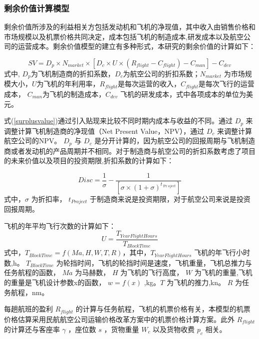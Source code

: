 \documentclass[12pt,a4paper]{report}
\begin{document}
\subsubsection{剩余价值计算模型}
剩余价值所涉及的利益相关方包括发动机和飞机的净现值，其中收入由销售价格和市场规模以及机票价格共同决定，成本包括飞机的制造成本,研发成本以及航空公司的运营成本。剩余价值模型的建立有多种形式，本研究的剩余价值的计算如下：

\begin{equation}
\label{surplusvalue}
SV={{D}_{p}}\times {{N}_{market}}\times \left[ {{D}_{c}}\times U\times \left( {{R}_{flight}}-{{C}_{flight}} \right)-{{C}_{man}} \right]-{{C}_{dev}}
\end{equation}
式中, $D_{p} $为飞机制造商的折扣系数，$ D_{c}$为航空公司的折扣系数；$ N_{market}$ 为市场规模大小，$U$为飞机的年利用率，$ R_{flight} $是每次运营的收入，$ C_{flight} $是每次飞行的运营成本， $ C_{man} $为飞机的制造成本，$ C_{dev} $ 飞机的研发成本，式中各项成本的单位为美元。

式(\ref{surplusvalue})通过引入贴现来比较不同时期内成本与收益的不同。通过 $ D_{p} $ 来调整计算飞机制造商的净现值（Net Present Value，NPV），通过 $ D_{c} $ 来调整计算航空公司的NPV。 $ D_{p} $ 与 $ D_{c} $ 是分开计算的，因为航空公司的回报周期与飞机制造商或者发动机的产品周期并不相同。对于制造商与航空公司的折扣系数考虑了项目的未来价值以及项目的投资期限,折扣系数的计算如下：

\begin{equation}
\label{discvalue}
Disc=\frac{1}{\sigma }-\frac{1}{\left[ \sigma \times {{\left( 1+\sigma  \right)}^{{{t}_{\Pr oject}}}} \right]}
\end{equation}
式中，$  \sigma  $ 为折扣率， $ t_{Project} $  于制造商来说是投资期限，对于航空公司来说是投资回报周期。

飞机的年平均飞行次数的计算如下：
\begin{equation}
\label{utilization}
U=\frac{{{T}_{YearFlightHours}}}{{{T}_{BlockTime}}}
\end{equation}
式中，${{T}_{BlockTime}}=f\left( Ma,H,W,T,R \right)$，其中，$ T_{YearFlightHours} $ 飞机的年飞行小时数,h。 $ T_{BlockTime} $  为轮挡时间，飞机的轮挡时间是速度，飞机重量，飞机总推力与任务航程的函数，  $ Ma $ 为马赫数，
 $H$  为飞机的飞行高度， $W$ 为飞机的重量,飞机的重量是飞机设计参数x的函数， $w=f \left( x \right)  $ ,kg。$ T $ 为飞机的推力,kn。 $R$ 为任务航程，nm。

每趟航班的盈利 $ R_{flight} $ 的计算与任务航程，飞机的机票价格有关，本模型的机票价格估算采用民航航空公司运输价格改革方案中的机票价格计算方案。此外 $ R_{flight} $ 的计算还与客座率 $  \gamma  $ ，座位数 $ s $ ，货物重量 $ W_{c} $ 以及货物收费 $ p_{c} $ 相关。
\end{document}
